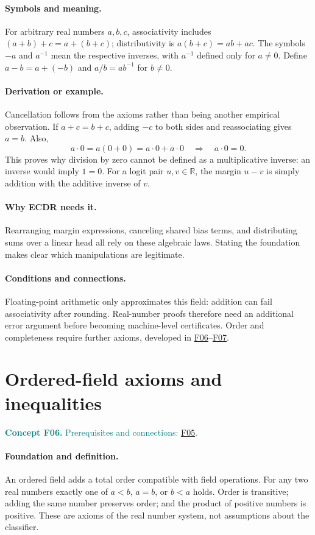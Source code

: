 \documentclass[11pt,a4paper]{article}
\newcommand{\R}{\mathbb R}
\newcommand{\conceptid}{Front matter}
\newcommand{\concept}[3]{\clearpage\renewcommand{\conceptid}{#1}%
\section{#2}\label{concept:#1}%
\textcolor{teal}{\textbf{Concept #1.} Prerequisites and connections: #3.}\par
\typeout{ECDR-CONCEPT-START #1 PAGE=\thepage}}
\begin{document}
\paragraph{Symbols and meaning.}
For arbitrary real numbers $a,b,c$, associativity includes
$(a+b)+c=a+(b+c)$; distributivity is $a(b+c)=ab+ac$. The symbols
$-a$ and $a^{-1}$ mean the respective inverses, with $a^{-1}$ defined
only for $a\ne0$. Define $a-b=a+(-b)$ and $a/b=a b^{-1}$ for $b\ne0$.
\paragraph{Derivation or example.}
Cancellation follows from the axioms rather than being another empirical
observation. If $a+c=b+c$, adding $-c$ to both sides and reassociating
gives $a=b$. Also,
\[
 a\cdot0=a(0+0)=a\cdot0+a\cdot0
 \quad\Rightarrow\quad a\cdot0=0.
\]
This proves why division by zero cannot be defined as a multiplicative
inverse: an inverse would imply $1=0$. For a logit pair $u,v\in\R$,
the margin $u-v$ is simply addition with the additive inverse of $v$.
\paragraph{Why ECDR needs it.}
Rearranging margin expressions, canceling shared bias terms, and
distributing sums over a linear head all rely on these algebraic laws.
Stating the foundation makes clear which manipulations are legitimate.
\paragraph{Conditions and connections.}
Floating-point arithmetic only approximates this field: addition can
fail associativity after rounding. Real-number proofs therefore need an
additional error argument before becoming machine-level certificates.
Order and completeness require further axioms, developed in \hyperref[concept:F06]{F06}--\hyperref[concept:F07]{F07}.
\par\label{endconcept:F05}

\concept{F06}{Ordered-field axioms and inequalities}{\hyperref[concept:F05]{F05}}
\paragraph{Foundation and definition.}
An ordered field adds a total order compatible with field operations.
For any two real numbers exactly one of $a<b$, $a=b$, or $b<a$ holds.
Order is transitive; adding the same number preserves order; and the
product of positive numbers is positive. These are axioms of the real
number system, not assumptions about the classifier.
\end{document}
